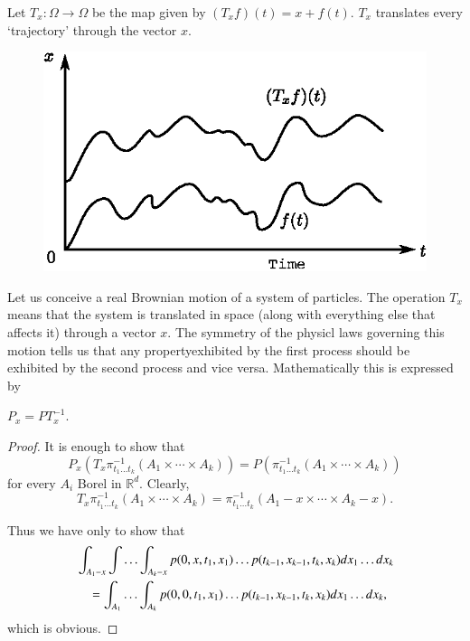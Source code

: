 Let $T_{x}:\Omega\to \Omega$ be the map given by
$(T_{x}f)(t)=x+f(t)$. $T_{x}$ translates every `trajectory' through
the vector $x$.
\begin{figure}[H]
\centering
\includegraphics{figure/fig3.eps}
\end{figure}

Let us conceive a real Brownian motion of a system of particles. The
operation $T_{x}$ means that the system is translated in space (along
with everything else that affects it) through a vector $x$. The
symmetry of the physicl laws governing this motion tells us that any
property\pageoriginale exhibited by the first process should be
exhibited by the second process and vice versa. Mathematically this is
expressed by

\begin{theorem*}
$P_{x}=PT_{x}^{-1}$.
\end{theorem*}

\begin{proof}
It is enough to show that
$$
P_{x}(T_{x}\pi^{-1}_{t_{1}\ldots t_{k}}(A_{1}\times\cdots \times
A_{k}))=P(\pi^{-1}_{t_{1}\ldots t_{k}}(A_{1}\times\cdots\times A_{k}))
$$
for every $A_{i}$ Borel in $\mathbb{R}^{d}$. Clearly,
$$
T_{x}\pi^{-1}_{t_{1}\ldots t_{k}}(A_{1}\times\cdots\times
A_{k})=\pi^{-1}_{t_{1}\ldots t_{k}}(A_{1}-x\times\cdots \times
A_{k}-x).
$$

Thus we have only to show that
\begin{align*}
&\int_{A_{1}-x}\int\ldots \int_{A_{k}-x}p(0,x,t_{1},x_{1})\ldots
p(t_{k-1},x_{k-1},t_{k},x_{k})dx_{1}\ldots dx_{k}\\
&\quad =\int_{A_{1}}\ldots \int_{A_{k}}p(0,0,t_{1},x_{1})\ldots
p(t_{k-1},x_{k-1},t_{k},x_{k})dx_{1}\ldots dx_{k},
\end{align*}
which is obvious.
\end{proof}

